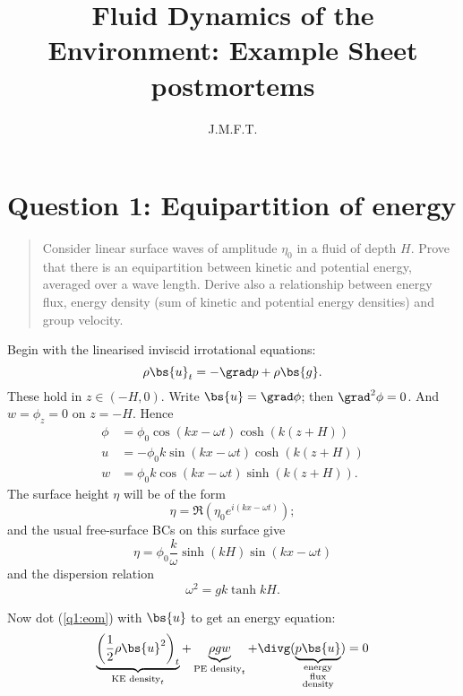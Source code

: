 \documentclass{article}
\title{Fluid Dynamics of the Environment: Example Sheet postmortems}
\author{J.M.F.T.}
\begin{document}
\maketitle
\tableofcontents

\section{Question 1: Equipartition of energy}

\begin{quote}
    Consider linear surface waves of amplitude $\eta_0$ in a fluid of depth $H$.
    Prove that there is an equipartition between kinetic and potential energy,
    averaged over a wave length. Derive also a relationship between energy flux,
    energy density (sum of kinetic and potential energy densities) and group
    velocity.
\end{quote}

Begin with the linearised inviscid irrotational equations:
\begin{equation}
    \rho\bs{u}_t = -\grad p + \rho\bs{g}.
    \label{q1:eom}
\end{equation}
These hold in $z\in(-H,0)$. Write $\bs{u}=\grad\phi$; then $\grad^2\phi=0$. And
$w=\phi_z=0$ on $z=-H$. Hence 
\begin{align}
    \phi &= \phi_0 \cos(kx-\omega t)\cosh(k(z+H)) \\
    u    &= -\phi_0 k \sin(kx-\omega t)\cosh(k(z+H)) \\
    w    &= \phi_0 k \cos(kx-\omega t)\sinh(k(z+H)).
\end{align}
The surface height $\eta$ will be of the form
\begin{equation}
    \eta = \Re (\eta_0 e^{i(kx-\omega t)});
\end{equation}
and the usual free-surface BCs on this surface give
\begin{equation}
    \eta = \phi_0 \frac{k}{\omega} \sinh(kH) \sin(kx-\omega t)
\end{equation}
and the dispersion relation
\begin{equation}
    \omega^2 = gk\tanh kH.
\end{equation}

Now dot (\ref{q1:eom}) with $\bs{u}$ to get an energy equation:
\begin{equation}
    \underbrace{\left(\frac{1}{2}\rho\bs{u}^2\right)_t}_{\text{KE density}_t} 
    + \underbrace{\rho gw}_{\text{PE density}_t} +
    \divg(\underbrace{p\bs{u}}_{\substack{\text{energy}\\\text{flux}\\\text{density}}}) = 0 
\end{equation}
\end{document}
